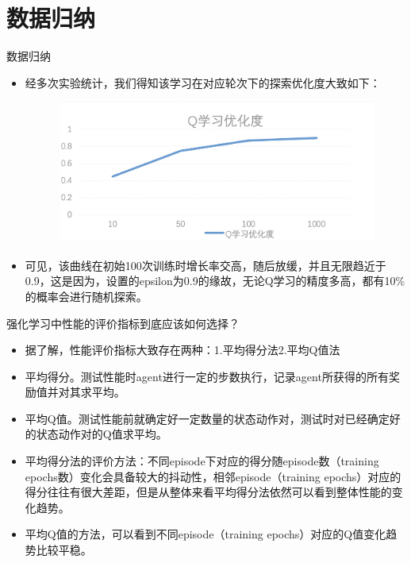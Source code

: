 \documentclass{beamer}
\begin{document}
\section{数据归纳}
\begin{frame}{数据归纳}
    \begin{itemize}
    \tiny
    \item 经多次实验统计，我们得知该学习在对应轮次下的探索优化度大致如下：
    
    
        \begin{minipage}{0.5\linewidth}
        \medskip
        \begin{figure}[h]
            \centering
            \includegraphics[height=.4\textheight]{pic/17.png}
        \end{figure}
    \end{minipage}
    
    \item 可见，该曲线在初始100次训练时增长率交高，随后放缓，并且无限趋近于0.9，这是因为，设置的epsilon为0.9的缘故，无论Q学习的精度多高，都有10\%的概率会进行随机探索。
    
    \end{itemize}
    
\end{frame}


\begin{frame}{强化学习中性能的评价指标到底应该如何选择？}
    \begin{itemize}
    \tiny
    \item 据了解，性能评价指标大致存在两种：1.平均得分法2.平均Q值法
    \item 平均得分。测试性能时agent进行一定的步数执行，记录agent所获得的所有奖励值并对其求平均。
    \item 平均Q值。测试性能前就确定好一定数量的状态动作对，测试时对已经确定好的状态动作对的Q值求平均。
    \item 平均得分法的评价方法：不同episode下对应的得分随episode数（training epochs数）变化会具备较大的抖动性，相邻episode（training epochs）对应的得分往往有很大差距，但是从整体来看平均得分法依然可以看到整体性能的变化趋势。
    \item 平均Q值的方法，可以看到不同episode（training epochs）对应的Q值变化趋势比较平稳。
   \end{itemize}
    
\end{frame}
\end{document}
